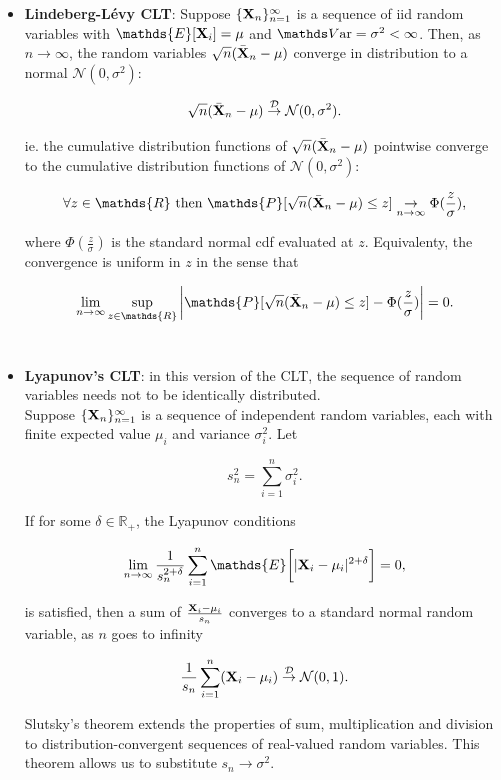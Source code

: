 \documentclass{homework}
\begin{document}
\begin{itemize}
    \item \textbf{Lindeberg-Lévy CLT}: Suppose $\{{\bf X}_n\}_{n=1}^{\infty}$ is a sequence of iid random variables with $\mathds{E}[\X_i]= \mu$ and $\var = \sigma^2 < \infty$. Then, as $n \rightarrow \infty$, the random variables $\sqrt{n}(\bar{{\bf X}}_n - \mu)$ converge in distribution to a normal $\mathcal{N}(0,\sigma^2)$:
    
    $$
   \sqrt{n}(\bar{{\bf X}}_n - \mu) \overset{\mathcal{D}}{\rightarrow} \mathcal{N}(0,\sigma^2).
   $$ 
   
   ie. the cumulative distribution functions of $\sqrt{n}(\bar{{\bf X}}_n - \mu)$ pointwise converge to the cumulative distribution functions of $\mathcal{N}(0,\sigma^2)$:
   
   $$
   \forall z \in \mathds{R} \textnormal{ then } \mathds{P}[\sqrt{n}(\bar{\X}_n - \mu) \leq z] \underset{n \rightarrow \infty}{\rightarrow} \Phi(\frac{z}{\sigma}),
   $$
   
   where $ \Phi(\frac{z}{\sigma})$ is the standard normal cdf evaluated at $z$. Equivalenty, the convergence is uniform in $z$ in the sense that 
   
   $$
   \lim_{\n} \sup_{z \in \mathds{R}} \bigg|\mathds{P}[\sqrt{n}(\bar{\X}_n - \mu) \leq z]-\Phi(\frac{z}{\sigma})\bigg| = 0. 
   $$\\
   
   \item \textbf{Lyapunov's CLT}: in this version of the CLT, the sequence of random variables needs not to be identically distributed. \\
   
   Suppose $\{{\bf X}_n\}_{n=1}^{\infty}$ is a sequence of independent random variables, each with finite expected value $\mu_i$ and variance $\sigma^2_i$. Let 
   
   $$
   s_n^2 = \sum_{i=1}^{n} \sigma_i^2.
   $$
   
   If for some $\delta \in \mathds{R}_+$, the Lyapunov conditions 
   
   $$
   \lim_{\n} \frac{1}{s_n^{2+\delta}} \sum_{i=1}^{n} \mathds{E}\bigg[|\X_i - \mu_i|^{2+\delta}\bigg] = 0,
   $$
   
   is satisfied, then a sum of $\frac{{\bf X}_i - \mu_i}{s_n}$
   converges to a standard normal random variable, as $n$ goes to infinity 
   
   $$
   \frac{1}{s_n} \sum_{i=1}^{n} ({\bf X}_i - \mu_i) \overset{\mathcal{D}}{\rightarrow} \mathcal{N}(0,1).
   $$
   
   Slutsky's theorem extends the properties of sum, multiplication and division to distribution-convergent sequences of real-valued random variables. This theorem allows us to substitute $s_n \rightarrow \sigma^2$. \\
   

\end{itemize}
\end{document}

